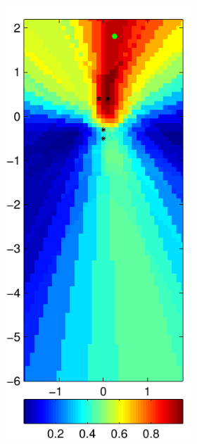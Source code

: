 \documentclass[spanish,openright]{book}
\begin{document}
\begin{figure}
  \begin{subfigure}[t]{0.47\textwidth}
    \begin{minipage}[t]{\textwidth}
      \begin{subfigure}[t]{0.3\textwidth}
        \includegraphics[width=\textwidth]{Pattern_Fo1500_pos08}

\end{subfigure}
\end{minipage}
\end{subfigure}
\end{figure}
\end{document}
